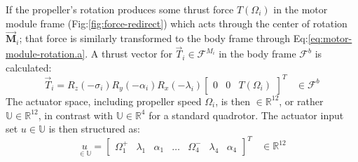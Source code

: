 \par
If the propeller's rotation produces some thrust force $T(\Omega_i)$ in the motor module frame (Fig:\ref{fig:force-redirect}) which acts through the center of rotation $\vec{\mathbf{M}}_i$; that force is similarly transformed to the body frame through Eq:\ref{eq:motor-module-rotation.a}. A thrust vector for $\vec{T}_i\in\mathcal{F}^{M_i}$ in the body frame $\mathcal{F}^b$ is calculated:
\begin{equation}\label{eq:motor-module-force-redirect}
\vec{T}_i=R_z(-\sigma_i)R_y(-\alpha_i)R_x(-\lambda_i)\begin{bmatrix}0 & 0 & T(\Omega_i)\end{bmatrix}^T~~~~\in\mathcal{F}^{b}
\end{equation}
The actuator space, including propeller speed $\Omega_i$, is then $\in\mathbb{R}^{12}$, or rather $\mathbb{U}\in\mathbb{R}^{12}$, in contrast with $\mathbb{U}\in\mathbb{R}^4$ for a standard quadrotor. The actuator input set $u \in \mathbb{U}$ is then structured as:
\begin{equation}\label{eq:actuator-space}
\underset{\in\mathbb{U}}{u}=\begin{bmatrix}
\Omega_1^+ & \lambda_1 & \alpha_1 & \ldots & \Omega_4^- & \lambda_4 & \alpha_4
\end{bmatrix}^T~~~~\in\mathbb{R}^{12}
\end{equation}
\newpage
